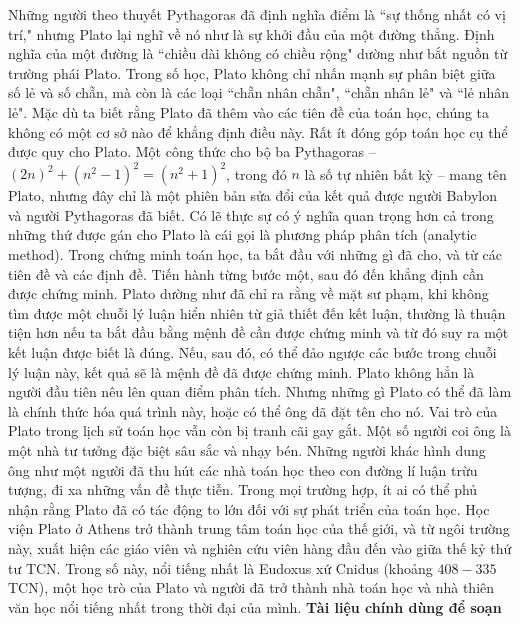 \begin{multicols}{2}
	\vskip 0.1cm
	Những người theo thuyết Pythagoras đã định nghĩa điểm là ``sự thống nhất có vị trí," nhưng Plato lại nghĩ về nó như là sự khởi đầu của một đường thẳng.
	\vskip 0.1cm 
	Định nghĩa của một đường là ``chiều dài không có chiều rộng" dường như bắt nguồn từ trường phái Plato.
	\vskip 0.1cm
	Trong số học, Plato không chỉ nhấn mạnh sự phân biệt giữa số lẻ và số chẵn, mà còn là các loại ``chẵn nhân chẵn", ``chẵn nhân lẻ" và ``lẻ nhân lẻ". Mặc dù ta biết rằng Plato đã thêm vào các tiên đề của toán học, chúng ta không có một cơ sở nào để khẳng định điều này.
	\vskip 0.1cm
	Rất ít đóng góp toán học cụ thể được quy cho Plato. Một công thức cho bộ ba Pythagoras -- ${(2n)^2} + {({n^2} - 1)^2} = {({n^2} + 1)^2}$, trong đó  $n$ là số tự nhiên bất kỳ -- mang tên Plato, nhưng đây chỉ là một phiên bản sửa đổi của kết quả được người Babylon và người Pythagoras đã biết. 
	\vskip 0.1cm
	Có lẽ thực sự có ý nghĩa quan trọng hơn cả trong những thứ được gán cho Plato là cái gọi là phương pháp phân tích (analytic method).
	\vskip 0.1cm
	Trong chứng minh toán học, ta bắt đầu với những gì đã cho, và từ các tiên đề và các định đề. Tiến hành từng bước một, sau đó đến khẳng định cần được chứng minh.
	\vskip 0.1cm
	Plato dường như đã chỉ ra rằng  về mặt sư phạm, khi không tìm được một chuỗi lý luận hiển nhiên từ giả thiết đến kết luận, thường là thuận tiện hơn nếu ta bắt đầu bằng mệnh đề cần được chứng minh và từ đó suy ra một kết luận được biết là đúng. Nếu, sau đó, có thể đảo ngược các bước trong chuỗi lý luận này, kết quả sẽ là mệnh đề đã được chứng minh.
	\vskip 0.1cm
	Plato không hẳn là người đầu tiên nêu lên quan điểm phân tích.  Nhưng những gì Plato có thể đã làm là chính thức hóa quá trình này, hoặc có thể ông đã đặt tên cho nó.
	\vskip 0.1cm
	Vai trò của Plato trong lịch sử toán học vẫn còn bị tranh cãi gay gắt. Một số người coi ông là một nhà tư tưởng đặc biệt sâu sắc và nhạy bén. Những người khác hình dung ông như một người đã thu hút các nhà toán học theo con đường lí luận trừu tượng, đi xa những vấn đề thực tiễn. 
	\vskip 0.1cm
	Trong mọi trường hợp, ít ai có thể phủ nhận rằng Plato đã có tác động to lớn đối với sự phát triển của toán học. Học viện Plato ở Athens trở thành trung tâm toán học của thế giới, và từ ngôi trường này, xuất hiện các giáo viên và nghiên cứu viên hàng đầu đến vào giữa thế kỷ thứ tư TCN. Trong số này, nổi tiếng nhất là Eudoxus xứ Cnidus (khoảng $408-335$ TCN),  một học trò của Plato và người đã trở thành nhà toán học và nhà thiên văn học nổi tiếng nhất trong thời đại của mình.
	\vskip 0.1cm
	\textbf{\color{lichsutoanhoc}Tài liệu chính dùng để soạn}

\end{multicols}

